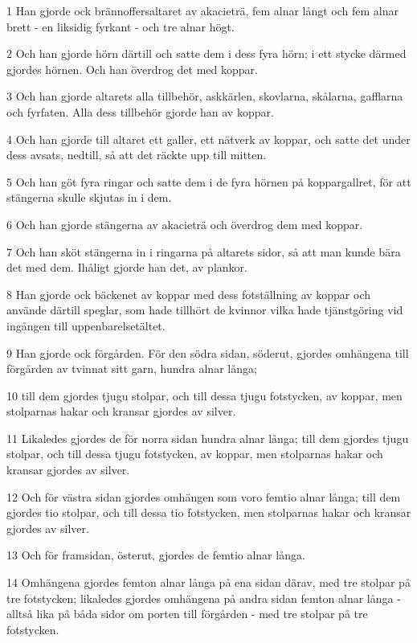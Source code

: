 \par 1 Han gjorde ock brännoffersaltaret av akacieträ, fem alnar långt och fem alnar brett - en liksidig fyrkant - och tre alnar högt.
\par 2 Och han gjorde hörn därtill och satte dem i dess fyra hörn; i ett stycke därmed gjordes hörnen. Och han överdrog det med koppar.
\par 3 Och han gjorde altarets alla tillbehör, askkärlen, skovlarna, skålarna, gafflarna och fyrfaten. Alla dess tillbehör gjorde han av koppar.
\par 4 Och han gjorde till altaret ett galler, ett nätverk av koppar, och satte det under dess avsats, nedtill, så att det räckte upp till mitten.
\par 5 Och han göt fyra ringar och satte dem i de fyra hörnen på koppargallret, för att stängerna skulle skjutas in i dem.
\par 6 Och han gjorde stängerna av akacieträ och överdrog dem med koppar.
\par 7 Och han sköt stängerna in i ringarna på altarets sidor, så att man kunde bära det med dem. Ihåligt gjorde han det, av plankor.
\par 8 Han gjorde ock bäckenet av koppar med dess fotställning av koppar och använde därtill speglar, som hade tillhört de kvinnor vilka hade tjänstgöring vid ingången till uppenbarelsetältet.
\par 9 Han gjorde ock förgården. För den södra sidan, söderut, gjordes omhängena till förgården av tvinnat sitt garn, hundra alnar långa;
\par 10 till dem gjordes tjugu stolpar, och till dessa tjugu fotstycken, av koppar, men stolparnas hakar och kransar gjordes av silver.
\par 11 Likaledes gjordes de för norra sidan hundra alnar långa; till dem gjordes tjugu stolpar, och till dessa tjugu fotstycken, av koppar, men stolparnas hakar och kransar gjordes av silver.
\par 12 Och för västra sidan gjordes omhängen som voro femtio alnar långa; till dem gjordes tio stolpar, och till dessa tio fotstycken, men stolparnas hakar och kransar gjordes av silver.
\par 13 Och för framsidan, österut, gjordes de femtio alnar långa.
\par 14 Omhängena gjordes femton alnar långa på ena sidan därav, med tre stolpar på tre fotstycken; likaledes gjordes omhängena på andra sidan femton alnar långa - alltså lika på båda sidor om porten till förgården - med tre stolpar på tre fotstycken.
